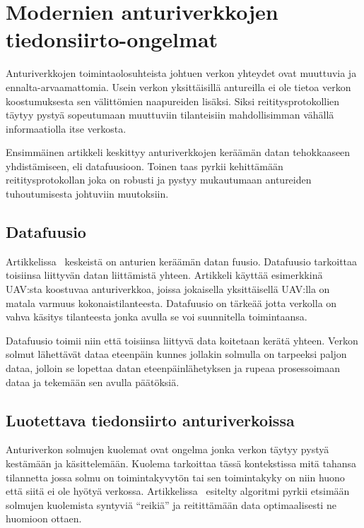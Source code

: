 \section{Modernien anturiverkkojen tiedonsiirto-ongelmat}

Anturiverkkojen toimintaolosuhteista johtuen verkon yhteydet ovat muuttuvia ja
ennalta-arvaamattomia. Usein verkon yksittäisillä antureilla ei ole tietoa
verkon koostumuksesta sen välittömien naapureiden lisäksi. Siksi
reititysprotokollien täytyy pystyä sopeutumaan muuttuviin tilanteisiin
mahdollisimman vähällä informaatiolla itse verkosta.

Ensimmäinen artikkeli keskittyy anturiverkkojen keräämän datan tehokkaaseen
yhdistämiseen, eli datafuusioon. Toinen taas pyrkii kehittämään
reititysprotokollan joka on robusti ja pystyy mukautumaan antureiden
tuhoutumisesta johtuviin muutoksiin.

\subsection{Datafuusio}
Artikkelissa~\cite{Yu2006} keskeistä on anturien keräämän datan fuusio.
Datafuusio tarkoittaa toisiinsa liittyvän datan liittämistä yhteen. Artikkeli
käyttää esimerkkinä UAV:sta koostuvaa anturiverkkoa, joissa jokaisella
yksittäisellä UAV:lla on matala varmuus kokonaistilanteesta. Datafuusio on
tärkeää jotta verkolla on vahva käsitys tilanteesta jonka avulla se voi
suunnitella toimintaansa.

Datafuusio toimii niin että toisiinsa liittyvä data koitetaan kerätä yhteen.
Verkon solmut lähettävät dataa eteenpäin kunnes jollakin solmulla on tarpeeksi
paljon dataa, jolloin se lopettaa datan eteenpäinlähetyksen ja rupeaa
prosessoimaan dataa ja tekemään sen avulla päätöksiä.

\subsection{Luotettava tiedonsiirto anturiverkoissa}
Anturiverkon solmujen kuolemat ovat ongelma jonka verkon täytyy pystyä
kestämään ja käsittelemään. Kuolema tarkoittaa tässä kontekstissa mitä tahansa
tilannetta jossa solmu on toimintakyvytön tai sen toimintakyky on niin huono
että siitä ei ole hyötyä verkossa. Artikkelissa~\cite{Arya2015} esitelty
algoritmi pyrkii etsimään solmujen kuolemista syntyviä ``reikiä'' ja
reitittämään data optimaalisesti ne huomioon ottaen.



